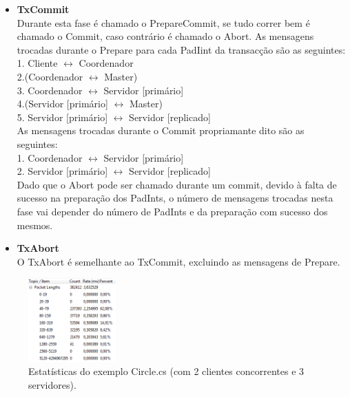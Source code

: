 \begin{description}
\begin{itemize}
\item \textbf{TxCommit}\\
Durante esta fase é chamado o PrepareCommit, se tudo correr bem é chamado o Commit, caso contrário é chamado o Abort. As mensagens trocadas durante o Prepare para cada PadIint da transacção são as seguintes:\\[0,05in]
1. Cliente $\longleftrightarrow$ Coordenador\\
2.(Coordenador $\longleftrightarrow$ Master)\footnotemark[2]\\ 
3. Coordenador $\longleftrightarrow$ Servidor [primário]\\
4.(Servidor [primário] $\longleftrightarrow$ Master)\footnotemark[2]\\
5. Servidor [primário] $\longleftrightarrow$ Servidor [replicado]\\[0,05in]
As mensagens trocadas durante o Commit propriamante dito são as seguintes:\\[0,05in]
1. Coordenador $\longleftrightarrow$ Servidor [primário]\\
2. Servidor [primário] $\longleftrightarrow$ Servidor [replicado]\\[0,05in]
Dado que o Abort pode ser chamado durante um commit, devido à falta de sucesso na preparação dos PadInts, o número de mensagens trocadas nesta fase vai depender do número de PadInts e da preparação com sucesso dos mesmos.

\item \textbf{TxAbort}\\
O TxAbort é semelhante ao TxCommit, excluindo as mensagens de Prepare.
\end{itemize}

\begin{figure}[htb]
\centering
\includegraphics[width=0.3\textwidth]{packet.png}
\caption{\label{fig:packet}Estatísticas do exemplo Circle.cs (com 2 clientes concorrentes e 3 servidores).}
\end{figure}


\end{description}
